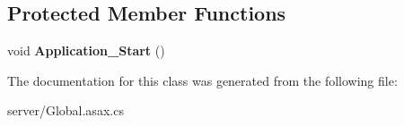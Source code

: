 \subsection*{Protected Member Functions}
\begin{DoxyCompactItemize}
\item 
\hypertarget{classServer_1_1MvcApplication_a31c9550b5dfb6c0949ba8b687169b18f}{void {\bfseries Application\-\_\-\-Start} ()}\label{classServer_1_1MvcApplication_a31c9550b5dfb6c0949ba8b687169b18f}

\end{DoxyCompactItemize}


The documentation for this class was generated from the following file\-:\begin{DoxyCompactItemize}
\item 
server/Global.\-asax.\-cs\end{DoxyCompactItemize}
